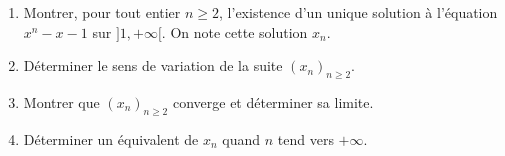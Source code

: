 \documentclass[a4paper,10pt]{report}
\begin{document}
%
%
%

%
%

%    
%

\begin{Exercice}{}
\begin{enumerate}
\item Montrer, pour tout entier $n \geq 2$,  l'existence d'un unique solution à l'équation $x^n-x-1$ sur $]1, + \infty[$. On note cette solution $x_n$.
\item Déterminer le sens de variation de la suite $(x_n)_{n \geq 2}$.
\item Montrer que  $(x_n)_{n \geq 2}$ converge et déterminer sa limite.
\item Déterminer un équivalent de $x_n$ quand $n$ tend vers $+ \infty$.
\end{enumerate}
\end{Exercice}
\end{document}
